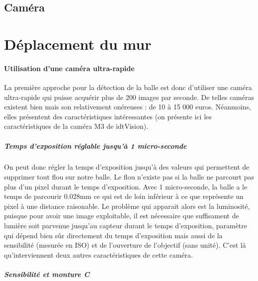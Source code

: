 \section{Caméra}










\chapter{Déplacement du mur}




\subsubsection{Utilisation d'une caméra ultra-rapide}

La première approche pour la détection de la balle est donc d'utiliser une caméra ultra-rapide qui puisse acquérir plus de 200 images par seconde. De telles caméras existent bien mais son relativement onéreuses : de 10 à 15 000 euros. Néanmoins, elles présentent des caractéristiques intéressantes (on présente ici les caractéristiques de la caméra M3 de idtVision).

\paragraph{Temps d'exposition réglable jusqu'à 1 micro-seconde\\}

On peut donc régler la temps d'exposition jusqu'à des valeurs qui permettent de supprimer tout flou sur notre balle. Le flou n'existe pas si la balle ne parcourt pas plus d'un pixel durant le temps d'exposition. Avec 1 micro-seconde, la balle a le temps de parcourir 0.028mm ce qui est de loin inférieur à ce que représente un pixel à une distance raisonable. Le problème qui apparait alors est la luminosité, puisque pour avoir une image exploitable, il est nécessaire que suffisament de lumière soit parvenue jusqu'au capteur durant le temps d'exposition, paramètre qui dépend bien sûr directement du temps d'exposition mais aussi de la sensibilité (mesurée en ISO) et de l'ouverture de l'objectif (sans unité). C'est là qu'interviennent deux autres caractéristiques de cette caméra. 

\paragraph{Sensibilité et monture C\\}


